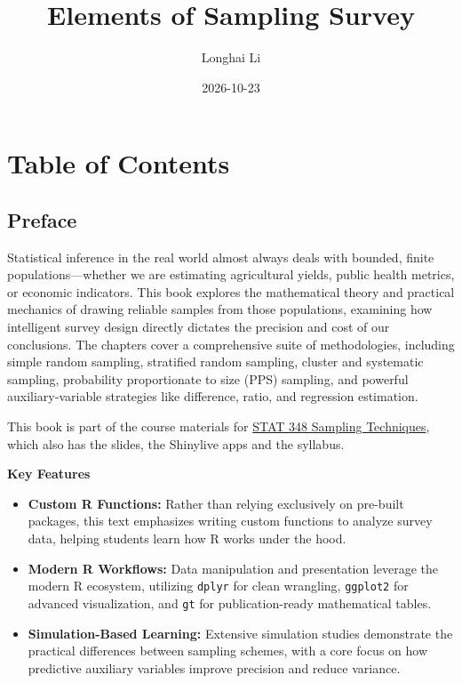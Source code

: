 \documentclass[
  letterpaper,
  DIV=11,
  numbers=noendperiod]{scrreprt}
\title{Elements of Sampling Survey}
\author{Longhai Li}
\date{2026-10-23}
\providecommand{\tightlist}{%
  \setlength{\itemsep}{0pt}\setlength{\parskip}{0pt}}
\renewcommand{\[}{\begin{equation}}
\renewcommand{\]}{\end{equation}}
\renewcommand*\contentsname{Table of contents}
\newcommand\contentsname{Table of contents}
\begin{document}
\maketitle

\renewcommand*\contentsname{Table of contents}
{
\setcounter{tocdepth}{2}
\tableofcontents
}


\chapter*{Table of Contents}\label{table-of-contents}


\section*{Preface}\label{preface}


Statistical inference in the real world almost always deals with
bounded, finite populations---whether we are estimating agricultural
yields, public health metrics, or economic indicators. This book
explores the mathematical theory and practical mechanics of drawing
reliable samples from those populations, examining how intelligent
survey design directly dictates the precision and cost of our
conclusions. The chapters cover a comprehensive suite of methodologies,
including simple random sampling, stratified random sampling, cluster
and systematic sampling, probability proportionate to size (PPS)
sampling, and powerful auxiliary-variable strategies like difference,
ratio, and regression estimation.

This book is part of the course materials for \href{../index.html}{STAT
348 Sampling Techniques}, which also has the slides, the Shinylive apps
and the syllabus.

\textbf{Key Features}

\begin{itemize}
\tightlist
\item
  \textbf{Custom R Functions:} Rather than relying exclusively on
  pre-built packages, this text emphasizes writing custom functions to
  analyze survey data, helping students learn how R works under the
  hood.
\item
  \textbf{Modern R Workflows:} Data manipulation and presentation
  leverage the modern R ecosystem, utilizing \texttt{dplyr} for clean
  wrangling, \texttt{ggplot2} for advanced visualization, and
  \texttt{gt} for publication-ready mathematical tables.
\item
  \textbf{Simulation-Based Learning:} Extensive simulation studies
  demonstrate the practical differences between sampling schemes, with a
  core focus on how predictive auxiliary variables improve precision and
  reduce variance.
\end{itemize}
\end{document}
